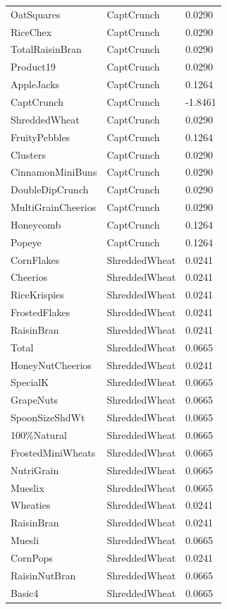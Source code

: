 \begin{table}[!htbp]
\begin{tabular}{lll}
OatSquares & CaptCrunch & 0.0290
\\
RiceChex & CaptCrunch & 0.0290
\\
TotalRaisinBran & CaptCrunch & 0.0290
\\
Product19 & CaptCrunch & 0.0290
\\
AppleJacks & CaptCrunch & 0.1264
\\
CaptCrunch & CaptCrunch & -1.8461
\\
ShreddedWheat & CaptCrunch & 0.0290
\\
FruityPebbles & CaptCrunch & 0.1264
\\
Clusters & CaptCrunch & 0.0290
\\
CinnamonMiniBuns & CaptCrunch & 0.0290
\\
DoubleDipCrunch & CaptCrunch & 0.0290
\\
MultiGrainCheerios & CaptCrunch & 0.0290
\\
Honeycomb & CaptCrunch & 0.1264
\\
Popeye & CaptCrunch & 0.1264
\\
CornFlakes & ShreddedWheat & 0.0241
\\
Cheerios & ShreddedWheat & 0.0241
\\
RiceKrispies & ShreddedWheat & 0.0241
\\
FrostedFlakes & ShreddedWheat & 0.0241
\\
RaisinBran & ShreddedWheat & 0.0241
\\
Total & ShreddedWheat & 0.0665
\\
HoneyNutCheerios & ShreddedWheat & 0.0241
\\
SpecialK & ShreddedWheat & 0.0665
\\
GrapeNuts & ShreddedWheat & 0.0665
\\
SpoonSizeShdWt & ShreddedWheat & 0.0665
\\
100\%Natural & ShreddedWheat & 0.0665
\\
FrostedMiniWheats & ShreddedWheat & 0.0665
\\
NutriGrain & ShreddedWheat & 0.0665
\\
Mueslix & ShreddedWheat & 0.0665
\\
Wheaties & ShreddedWheat & 0.0241
\\
RaisinBran & ShreddedWheat & 0.0241
\\
Muesli & ShreddedWheat & 0.0665
\\
CornPops & ShreddedWheat & 0.0241
\\
RaisinNutBran & ShreddedWheat & 0.0665
\\
Basic4 & ShreddedWheat & 0.0665

\end{tabular}
\end{table}
